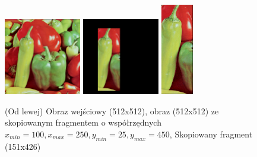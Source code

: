 \documentclass[final,a4paper,openany,12pt]{mwbk}
\begin{document}
\begin{figure}[H]
	\begin{center}
		\includegraphics[width=0.3\textwidth]{1/1Geo_Copy_Original}
		\includegraphics[width=0.3\textwidth]{1/1Geo_Copy_Result}
		\includegraphics[height=4cm]{1/1Geo_Copy_Result_Interp}
	\end{center}
	\caption{(Od lewej) Obraz wejściowy (512x512), obraz (512x512) ze skopiowanym fragmentem o współrzędnych $x_{min}=100, x_{max}=250, y_{min}=25, y_{max}=450$, Skopiowany fragment (151x426) }
\end{figure}
\end{document}
